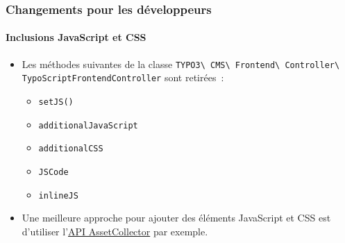 %

\begin{frame}[fragile]
	\frametitle{Changements pour les développeurs}
	\framesubtitle{Inclusions JavaScript et CSS}


	\begin{itemize}
		\item Les méthodes suivantes de la classe
			\smaller\texttt{TYPO3\textbackslash
				CMS\textbackslash
				Frontend\textbackslash
				Controller\textbackslash
				TypoScriptFrontendController}\normalsize\newline
			sont retirées~:

			\begin{itemize}
				\item \texttt{setJS()}
				\item \texttt{additionalJavaScript}
				\item \texttt{additionalCSS}
				\item \texttt{JSCode}
				\item \texttt{inlineJS}
			\end{itemize}

		\item Une meilleure approche pour ajouter des éléments JavaScript et CSS est d'utiliser
			l'\href{https://docs.typo3.org/m/typo3/reference-coreapi/master/en-us/ApiOverview/Assets/Index.html}{API AssetCollector}
			par exemple.
	\end{itemize}

\end{frame}

